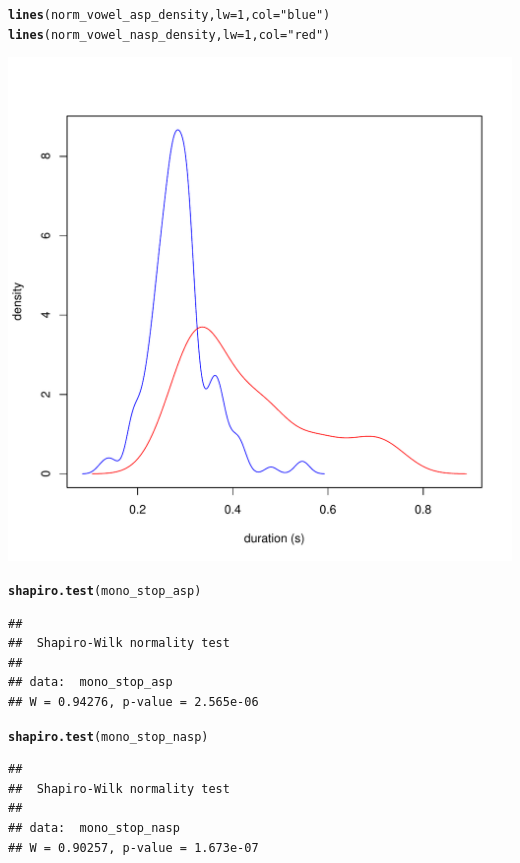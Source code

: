\documentclass[a4paper,11pt]{article}\usepackage[]{graphicx}\usepackage[]{color}
\makeatletter
\def\maxwidth{ %
  \ifdim\Gin@nat@width>\linewidth
    \linewidth
  \else
    \Gin@nat@width
  \fi
}
\newcommand{\hlnum}[1]{\textcolor[rgb]{0.686,0.059,0.569}{#1}}%
\newcommand{\hlstr}[1]{\textcolor[rgb]{0.192,0.494,0.8}{#1}}%
\newcommand{\hlstd}[1]{\textcolor[rgb]{0.345,0.345,0.345}{#1}}%
\newcommand{\hlkwc}[1]{\textcolor[rgb]{0.333,0.667,0.333}{#1}}%
\newcommand{\hlkwd}[1]{\textcolor[rgb]{0.737,0.353,0.396}{\textbf{#1}}}%
\newenvironment{kframe}{%
 \def\at@end@of@kframe{}%
 \ifinner\ifhmode%
  \def\at@end@of@kframe{\end{minipage}}%
  \begin{minipage}{\columnwidth}%
 \fi\fi%
 \def\FrameCommand##1{\hskip\@totalleftmargin \hskip-\fboxsep
 \colorbox{shadecolor}{##1}\hskip-\fboxsep
     \hskip-\linewidth \hskip-\@totalleftmargin \hskip\columnwidth}%
 \MakeFramed {\advance\hsize-\width
   \@totalleftmargin\z@ \linewidth\hsize
   \@setminipage}}%
 {\par\unskip\endMakeFramed%
 \at@end@of@kframe}
\newenvironment{knitrout}{}{} %
\makeatother
\begin{document}
\begin{knitrout}
\begin{kframe}
\begin{alltt}
\hlkwd{lines}\hlstd{(norm_vowel_asp_density,} \hlkwc{lw} \hlstd{=} \hlnum{1}\hlstd{,} \hlkwc{col} \hlstd{=} \hlstr{"blue"}\hlstd{)}
\hlkwd{lines}\hlstd{(norm_vowel_nasp_density,} \hlkwc{lw} \hlstd{=} \hlnum{1}\hlstd{,} \hlkwc{col} \hlstd{=} \hlstr{"red"}\hlstd{)}
\end{alltt}
\end{kframe}
\includegraphics[width=\maxwidth]{img/mono-stop-dens-1} 

\end{knitrout}

\begin{knitrout}
\color{fgcolor}\begin{kframe}
\begin{alltt}
\hlkwd{shapiro.test}\hlstd{(mono_stop_asp)}
\end{alltt}
\begin{verbatim}
## 
## 	Shapiro-Wilk normality test
## 
## data:  mono_stop_asp
## W = 0.94276, p-value = 2.565e-06
\end{verbatim}
\begin{alltt}
\hlkwd{shapiro.test}\hlstd{(mono_stop_nasp)}
\end{alltt}
\begin{verbatim}
## 
## 	Shapiro-Wilk normality test
## 
## data:  mono_stop_nasp
## W = 0.90257, p-value = 1.673e-07
\end{verbatim}
\end{kframe}
\end{knitrout}
\end{document}

